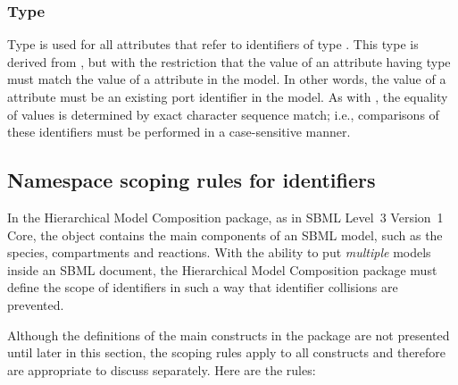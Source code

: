 \subsubsection{Type \hspace*{1pt}}
\label{primtype-portidref}

Type  is used for all attributes that refer to
identifiers of type .  This type is derived from
, but with the restriction that the value of an
attribute having type  must match the value of a
 attribute in the model.  In other words, the value of
a  attribute must be an existing port identifier in
the model.  As with , the equality of
 values is determined by exact character sequence
match; i.e., comparisons of these identifiers must be performed in a
case-sensitive manner.


\subsection{Namespace scoping rules for identifiers}
\label{namespaces}

In the Hierarchical Model Composition package, as in SBML Level~3
Version~1 Core, the \Model object contains the main components of an
SBML model, such as the species, compartments and reactions.  With the
ability to put \emph{multiple} models inside an SBML document, the
Hierarchical Model Composition package must define the scope of
identifiers in such a way that identifier collisions are prevented.

Although the definitions of the main constructs in the package are not
presented until later in this section, the scoping rules apply to all
constructs and therefore are appropriate to discuss separately.  Here
are the rules:

